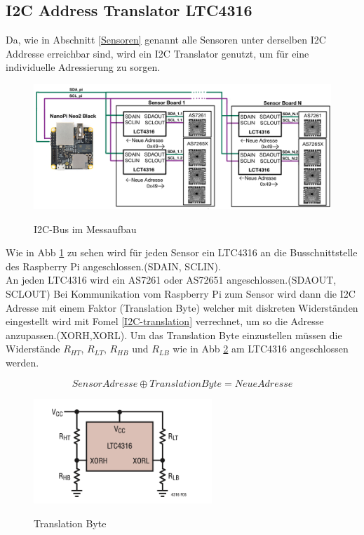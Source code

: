 \subsection{I2C Address Translator LTC4316}\label{I2C-Translator}
Da, wie in Abschnitt \ref{Sensoren} genannt alle Sensoren unter derselben I2C Addresse erreichbar sind, wird ein I2C Translator genutzt, um für eine individuelle Adressierung zu sorgen.\\

\begin{figure}[H]
  \centering
  \caption{I2C-Bus im Messaufbau}
 \includegraphics[width=1\linewidth]{img/Adress-Translation}
  \label{fig:adress-translation}
\end{figure}
\noindent Wie in Abb \ref{fig:adress-translation} zu sehen wird für jeden Sensor ein LTC4316 an die Busschnittstelle des Raspberry Pi angeschlossen.(SDAIN, SCLIN).\\ 
An jeden LTC4316 wird ein AS7261 oder AS72651 angeschlossen.(SDAOUT, SCLOUT)
Bei Kommunikation vom Raspberry Pi zum Sensor wird dann die I2C Adresse mit einem Faktor (Translation Byte) welcher mit diskreten Widerständen eingestellt wird mit Fomel \ref{I2C-translation} verrechnet, um so die Adresse anzupassen.(XORH,XORL).
Um das Translation Byte einzustellen müssen die Widerstände $R_{HT}$, $R_{LT}$, $R_{HB}$ und $R_{LB}$ wie in Abb \ref{fig:Translation-Byte} am LTC4316 angeschlossen werden.

\begin{equation} 
\label{I2C-translation}
Sensor Adresse\oplus TranslationByte = NeueAdresse
\end{equation}


\begin{figure}
\centering
\caption{Translation Byte}
\includegraphics[width=0.6\textwidth]{img/Translation-Byte}
\label{fig:Translation-Byte}
\end{figure}
\bigskip

